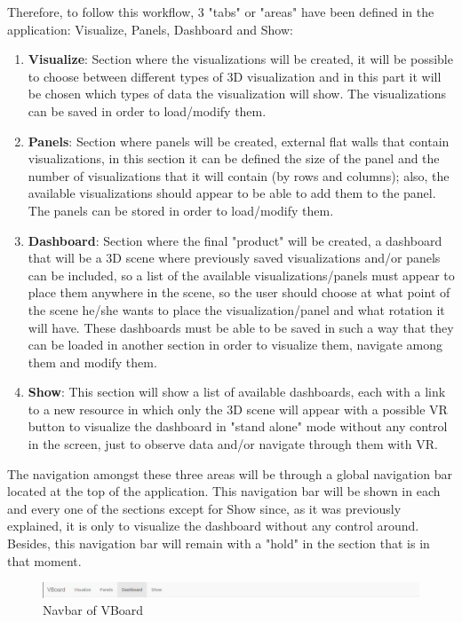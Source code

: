 \documentclass[a4paper, 12pt]{book}
\begin{document}
Therefore, to follow this workflow, 3 "tabs" or "areas" have been defined in the application: Visualize, Panels, Dashboard and Show:
\begin{enumerate}
    \item \textbf{Visualize}: Section where the visualizations will be created, it will be possible to choose between different types of 3D visualization and in this part it will be chosen which types of data the visualization will show. The visualizations can be saved in order to load/modify them.
    \item \textbf{Panels}: Section where panels will be created, external flat walls that contain visualizations, in this section it can be defined the size of the panel and the number of visualizations that it will contain (by rows and columns); also, the available visualizations should appear to be able to add them to the panel. The panels can be stored in order to load/modify them.
    \item \textbf{Dashboard}: Section where the final "product" will be created, a dashboard that will be a 3D scene where previously saved visualizations and/or panels can be included, so a list of the available visualizations/panels must appear to place them anywhere in the scene, so the user should choose at what point of the scene he/she wants to place the visualization/panel and what rotation it will have. These dashboards must be able to be saved in such a way that they can be loaded in another section in order to visualize them, navigate among them and modify them.
    \item \textbf{Show}: This section will show a list of available dashboards, each with a link to a new resource in which only the 3D scene will appear with a possible VR button to visualize the dashboard in "stand alone" mode without any control in the screen, just to observe data and/or navigate through them with VR.
\end{enumerate}

The navigation amongst these three areas will be through a global navigation bar located at the top of the application. This navigation bar will be shown in each and every one of the sections except for Show since, as it was previously explained, it is only to visualize the dashboard without any control around. Besides, this navigation bar will remain with a "hold" in the section that is in that moment.

\begin{figure}[H]
  \centering
  \includegraphics[width=16cm, keepaspectratio]{img/development/navbar}
  \caption{Navbar of VBoard}
  \label{fig:pluginhtml}
\end{figure}
\end{document}
